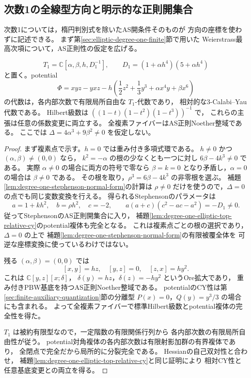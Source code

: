 \subsection{次数1の全線型方向と明示的な正則開集合}

次数1については，楕円判別式を除いたAS開条件そのものが
方向の座標を使わずに記述できる。
まず第\ref{sec:elliptic-degree-one-finite}節で用いた
Weierstrass最高次項について，AS正則性の仮定を広げる。

\begin{lemma}[特異なWeierstrass最高次項も含むAS開集合]
\label{lem:degree-one-all-top-as-open}
\[
 T_1=\mathbb C[\alpha,\beta,h,D_1^{-1}],\qquad
 D_1=(1+\alpha h^4)(5+\alpha h^4)
\]
と置く。potential
\[
 \Phi=xyz-yxz-h\left(\frac12z^2+\frac13y^3+
                       \alpha x^4y+\beta x^6\right)
\]
の代数は，各内部次数で有限局所自由な $T_1$-代数であり，
相対的な3-Calabi--Yau代数である。
Hilbert級数は $((1-t)(1-t^2)(1-t^3))^{-1}$ で，
これらの主張は任意の係数変更に両立する。
全複素ファイバーはAS正則Noether整域である。
ここでは $\Delta=4\alpha^3+9\beta^2\ne0$ を仮定しない。
\end{lemma}
\begin{proof}
まず複素点で示す。$h=0$ では重み付き多項式環である。
$h\ne0$ かつ $(\alpha,\beta)\ne(0,0)$ なら，
$k^2=-\alpha$ の根の少なくとも一つに対し
$6\beta-4k^3\ne0$ である。
実際 $\alpha\ne0$ の場合に両方の符号で零なら
$\beta=k=0$ となり矛盾し，$\alpha=0$ の場合は $\beta\ne0$ である。
その根を取り，$\rho^3=6\beta-4k^3$ の非零根を選ぶ。
補題\ref{lem:degree-one-stephenson-normal-form}の計算は
$\rho\ne0$ だけを使うので，$\Delta=0$ の点でも同じ変数変換を行える。
得られるStephensonのパラメータは
\[
 a=1+kh^2,\quad b=\rho h^2,\quad c=-2,
 \qquad a(a+c)(c^2-ac-a^2)=-D_1\ne0.
\]
従ってStephenson\cite[Theorem~1.1]{Stephenson1997}のAS正則開集合に入り，
補題\ref{lem:degree-one-elliptic-top-relative-cy}のpotential複体も完全となる。
これは複素点ごとの根の選択であり，$\Delta=0$ の上で
補題\ref{lem:degree-one-stephenson-normal-form}の有限被覆全体を
可逆な座標変換に使っているわけではない。

残る $(\alpha,\beta)=(0,0)$ では
\[
 [x,y]=hz,\quad [y,z]=0,\quad [z,x]=hy^2.
\]
これは $\mathbb C[y,z][x;\delta]$，
$\delta(y)=hz$，$\delta(z)=-hy^2$ というOre拡大であり，
重み付きPBW基底を持つAS正則Noether整域である。
potentialのCY性は第\ref{sec:finite-auxiliary-quantization}節の分離型
$P(x)=0$，$Q(y)=y^3/3$ の場合にも含まれる。
よって全複素ファイバーで標準Hilbert級数とpotential複体の完全性を得た。

$T_1$ は被約有限型なので，一定階数の有限関係行列から
各内部次数の有限局所自由性が従う。
potential対角複体の各内部次数は有限射影加群の有界複体であり，
全閉点で完全だから局所的に分裂完全である。
Hessianの自己双対性と合わせ，
補題\ref{lem:degree-one-elliptic-top-relative-cy}と同じ証明により
相対CY性と任意基底変更との両立を得る。
\end{proof}

